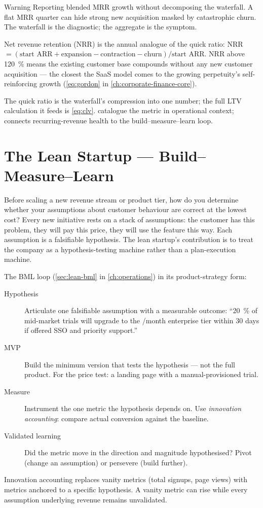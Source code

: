 \begin{admonition}{Warning}
Reporting blended MRR growth without decomposing the waterfall. A flat MRR quarter can hide strong new acquisition masked by catastrophic churn. The waterfall is the diagnostic; the aggregate is the symptom.
\end{admonition}

Net revenue retention (NRR) is the annual analogue of the quick ratio: NRR \(= (\text{start ARR} + \text{expansion} - \text{contraction} - \text{churn}) / \text{start ARR}\). NRR above \qty{120}{\percent} means the existing customer base compounds without any new customer acquisition --- the closest the SaaS model comes to the growing perpetuity's self-reinforcing growth (\cref{eq:gordon} in \cref{ch:corporate-finance-core}).

The quick ratio is the waterfall's compression into one number; the full LTV calculation it feeds is \cref{eq:clv}. \textcite{bendle2020marketing} catalogue the metric in operational context; \textcite{ries2011} connects recurring-revenue health to the build--measure--learn loop.

\section{The Lean Startup --- Build--Measure--Learn}\label{sec:lean-startup}

Before scaling a new revenue stream or product tier, how do you determine whether your assumptions about customer behaviour are correct at the lowest cost? Every new initiative rests on a stack of assumptions: the customer has this problem, they will pay this price, they will use the feature this way. Each assumption is a falsifiable hypothesis. The lean startup's contribution is to treat the company as a hypothesis-testing machine rather than a plan-execution machine.

The BML loop (\cref{sec:lean-bml} in \cref{ch:operations}) in its product-strategy form:
\begin{description}
  \item[Hypothesis] Articulate one falsifiable assumption with a measurable outcome: ``\qty{20}{\percent} of mid-market trials will upgrade to the /month enterprise tier within 30 days if offered SSO and priority support.''
  \item[MVP] Build the minimum version that tests the hypothesis --- not the full product. For the price test: a landing page with a manual-provisioned trial.
  \item[Measure] Instrument the one metric the hypothesis depends on. Use \emph{innovation accounting}: compare actual conversion against the baseline.
  \item[Validated learning] Did the metric move in the direction and magnitude hypothesised? Pivot (change an assumption) or persevere (build further).
\end{description}
Innovation accounting replaces vanity metrics (total signups, page views) with metrics anchored to a specific hypothesis. A vanity metric can rise while every assumption underlying revenue remains unvalidated.

